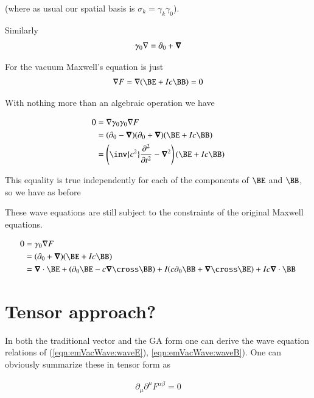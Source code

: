 (where as usual our spatial basis is $\sigma_k = \gamma_k \gamma_0$).

Similarly
\begin{align*}
\gamma_0 \nabla 
&=
\partial_0 + \boldsymbol{\nabla} \\
\end{align*}

For the vacuum Maxwell's equation is just
\begin{align*}
\grad F = \grad (\BE + I c \BB) = 0
\end{align*}

With nothing more than an algebraic operation we have

\begin{align*}
0 
&= \grad \gamma_0 \gamma_0 \grad F \\
&=
( \partial_0 - \spacegrad ) ( \partial_0 + \spacegrad ) (\BE + I c \BB) \\
&=
\left( \inv{c^2} \frac{\partial^2}{\partial t^2} - \spacegrad^2 \right) (\BE + I c \BB) \\
\end{align*}

This equality is true independently for each of the components of $\BE$ and $\BB$, so we have as before

These wave equations are still subject to the constraints of the original Maxwell equations.  

\begin{align*}
0 &= \gamma_0 \grad F \\
&= (\partial_0 + \spacegrad) (\BE + I c \BB) \\
&= 
  \spacegrad \cdot \BE 
+ (\partial_0 \BE - c \spacegrad \cross \BB)
+ I ( c \partial_0 \BB + \spacegrad \cross \BE )
+ I c \spacegrad \cdot \BB 
\\
\end{align*}

\section{Tensor approach?}

In both the traditional vector and the GA form one can derive the wave equation relations of (\ref{eqn:emVacWave:waveE}), \ref{eqn:emVacWave:waveB}).  One can obviously summarize these in tensor form as

\begin{align}\label{eqn:emVacWave:waveFaraday}
\partial_\mu\partial^\mu F^{\alpha\beta} = 0
\end{align}

